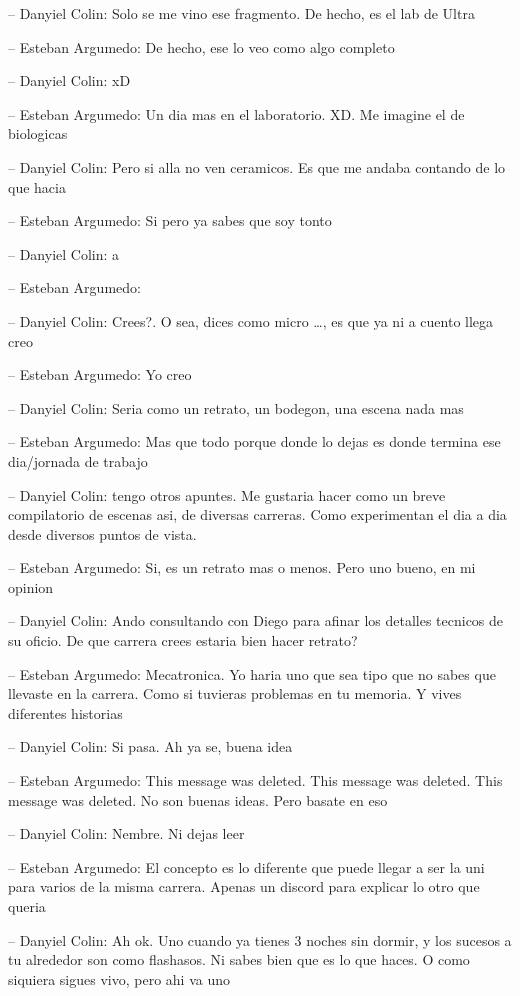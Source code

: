 -- Danyiel Colin: Solo se me vino ese fragmento. De hecho, es el lab de
Ultra

-- Esteban Argumedo: De hecho, ese lo veo como algo completo

-- Danyiel Colin: xD

-- Esteban Argumedo: Un dia mas en el laboratorio. XD. Me imagine el de
biologicas

-- Danyiel Colin: Pero si alla no ven ceramicos. Es que me andaba
contando de lo que hacia

-- Esteban Argumedo: Si pero ya sabes que soy tonto

-- Danyiel Colin: a

-- Esteban Argumedo:

-- Danyiel Colin: Crees?. O sea, dices como micro \ldots, es que ya ni a
cuento llega creo

-- Esteban Argumedo: Yo creo

-- Danyiel Colin: Seria como un retrato, un bodegon, una escena nada mas

-- Esteban Argumedo: Mas que todo porque donde lo dejas es donde termina
ese dia/jornada de trabajo

-- Danyiel Colin: tengo otros apuntes. Me gustaria hacer como un breve
compilatorio de escenas asi, de diversas carreras. Como experimentan el
dia a dia desde diversos puntos de vista.

-- Esteban Argumedo: Si, es un retrato mas o menos. Pero uno bueno, en
mi opinion

-- Danyiel Colin: Ando consultando con Diego para afinar los detalles
tecnicos de su oficio. De que carrera crees estaria bien hacer retrato?

-- Esteban Argumedo: Mecatronica. Yo haria uno que sea tipo que no sabes
que llevaste en la carrera. Como si tuvieras problemas en tu memoria. Y
vives diferentes historias

-- Danyiel Colin: Si pasa. Ah ya se, buena idea

-- Esteban Argumedo: This message was deleted. This message was deleted.
This message was deleted. No son buenas ideas. Pero basate en eso

-- Danyiel Colin: Nembre. Ni dejas leer

-- Esteban Argumedo: El concepto es lo diferente que puede llegar a ser
la uni para varios de la misma carrera. Apenas un discord para explicar
lo otro que queria

-- Danyiel Colin: Ah ok. Uno cuando ya tienes 3 noches sin dormir, y los
sucesos a tu alrededor son como flashasos. Ni sabes bien que es lo que
haces. O como siquiera sigues vivo, pero ahi va uno


